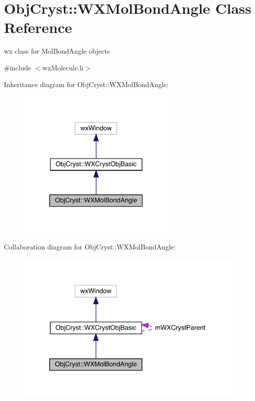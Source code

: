 \hypertarget{class_obj_cryst_1_1_w_x_mol_bond_angle}{}\section{Obj\+Cryst\+::W\+X\+Mol\+Bond\+Angle Class Reference}
\label{class_obj_cryst_1_1_w_x_mol_bond_angle}


wx class for Mol\+Bond\+Angle objects  




{\ttfamily \#include $<$wx\+Molecule.\+h$>$}



Inheritance diagram for Obj\+Cryst\+::W\+X\+Mol\+Bond\+Angle\+:
\nopagebreak
\begin{figure}[H]
\begin{center}
\leavevmode
\includegraphics[width=222pt]{class_obj_cryst_1_1_w_x_mol_bond_angle__inherit__graph}
\end{center}
\end{figure}


Collaboration diagram for Obj\+Cryst\+::W\+X\+Mol\+Bond\+Angle\+:
\nopagebreak
\begin{figure}[H]
\begin{center}
\leavevmode
\includegraphics[width=319pt]{class_obj_cryst_1_1_w_x_mol_bond_angle__coll__graph}
\end{center}
\end{figure}
